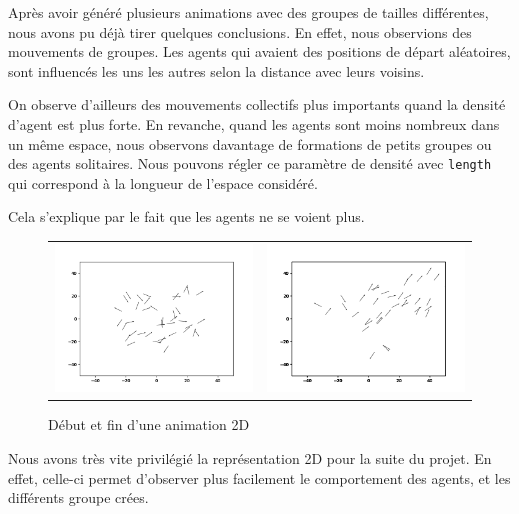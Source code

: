 \documentclass[french, a4paper, 12pt, openany]{report}
\begin{document}
   Après avoir généré plusieurs animations avec des groupes de tailles différentes, nous avons pu déjà tirer quelques conclusions. En effet, nous observions des mouvements de groupes. Les agents qui avaient des positions de départ aléatoires, sont influencés les uns les autres selon la distance avec leurs voisins.
   
   On observe d'ailleurs des mouvements collectifs plus importants quand la densité d'agent est plus forte. En revanche, quand les agents sont moins nombreux dans un même espace, nous observons davantage de formations de petits groupes ou des agents solitaires. Nous pouvons régler ce paramètre de densité avec \verb|length| qui correspond à la longueur de l'espace considéré.
   
   Cela s'explique par le fait que les agents ne se voient plus.
	\begin{figure}[!h]
		\centering
		\begin{tabular}{cc}
			\includegraphics[width=8cm]{images/image_3.png} & \includegraphics[width=8cm]{images/image_4.png} \\
		\end{tabular}
		\caption{Début et fin d'une animation 2D}
	\end{figure} 

   Nous avons très vite privilégié la représentation 2D pour la suite du projet. En effet, celle-ci permet d'observer plus facilement le comportement des agents, et les différents groupe crées. 
   
\end{document}
